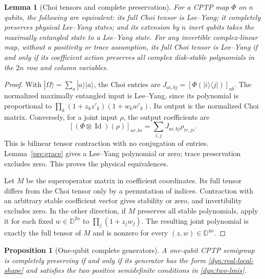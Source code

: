 \documentclass[reqno]{amsart}
\newtheorem{proposition}[theorem]{Proposition}
\newtheorem{lemma}[theorem]{Lemma}
\theoremstyle{definition}
\theoremstyle{remark}
\newcommand{\D}{\mathbb D}
\DeclareMathOperator{\Id}{Id}
\begin{document}
\begin{lemma}[Choi tensors and complete preservation]\label{dyn:choi}
For a CPTP map $\Phi$ on $n$ qubits, the following are equivalent:
its full Choi tensor is Lee--Yang; it completely preserves physical
Lee--Yang states; and its extension by $n$ inert qubits takes the maximally
entangled state to a Lee--Yang state.
For any invertible complex-linear map, without a positivity or trace
assumption, its full Choi tensor is Lee--Yang if and only if its
coefficient action preserves all complex disk-stable polynomials in the
$2n$ row and column variables.
\end{lemma}

\begin{proof}
With $|\Omega\rangle=\sum_a|a\rangle|a\rangle$, the Choi entries are
$J_{ai,bj}=[\Phi(|i\rangle\langle j|)]_{ab}$.
The normalized maximally entangled input is Lee--Yang, since its polynomial
is proportional to $\prod_k(1+z_kz'_k)(1+w_kw'_k)$.
Its output is the normalized Choi matrix.
Conversely, for a joint input $\rho$, the output coefficients are
\[
 [ (\Phi\otimes\Id)(\rho)]_{ar,bs}
 =\sum_{i,j}J_{ai,bj}\rho_{ir,js}.
\]
This is bilinear tensor contraction with no conjugation of entries.
Lemma~\ref{pre:grace} gives a Lee--Yang polynomial or zero;
trace preservation excludes zero.
This proves the physical equivalences.

Let $M$ be the superoperator matrix in coefficient coordinates.  Its full
tensor differs from the Choi tensor only by a permutation of indices.
Contraction with an arbitrary stable coefficient vector gives stability
or zero, and invertibility excludes zero.  In the other direction, if
$M$ preserves all stable polynomials, apply it for each fixed
$w\in\D^{2n}$ to $\prod_j(1+z_jw_j)$.
The resulting joint polynomial is exactly the full tensor of $M$ and
is nonzero for every $(z,w)\in\D^{4n}$.
\end{proof}

\begin{proposition}[One-qubit complete generators]\label{dyn:local-complete}
A one-qubit CPTP semigroup is completely preserving if and only if its
generator has the form \eqref{dyn:real-local-shape} and satisfies the two
positive semidefinite conditions in \eqref{dyn:two-lmis}.
\end{proposition}
\end{document}
